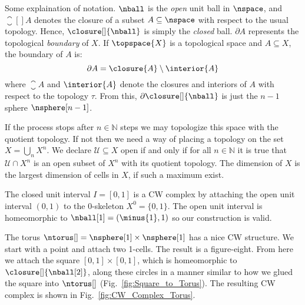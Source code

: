 \documentclass{book}                                                           %
\begin{document}
            \par\hfill\par
            Some explaination of notation. $\nball$ is the \textit{open} unit
            ball in $\nspace$, and $\closure[]{A}$ denotes the closure of a
            subset $A\subseteq\nspace$ with respect to the usual topology.
            Hence, $\closure[]{\nball}$ is simply the \textit{closed} ball.
            $\partial{A}$ represents the topological \textit{boundary} of
            $X$. If $\topspace{X}$ is a topological space and
            $A\subseteq{X}$, the boundary of $A$ is:
            \begin{equation}
                \partial{A}=\closure{A}\setminus\interior{A}
            \end{equation}
            where $\closure{A}$ and $\interior{A}$ denote the closures and
            interiors of $A$ with respect to the topology $\tau$. From this,
            $\partial\closure[]{\nball}$ is just the $n-1$ sphere
            $\nsphere[n-1]$.
            \par\hfill\par
            If the process stops after $n\in\mathbb{N}$ steps we may
            topologize this space with the quotient topology. If not then we
            need a way of placing a topology on the set $X=\bigcup_{n}X^{n}$. We
            declare $\mathcal{U}\subseteq{X}$ open if and only if for all
            $n\in\mathbb{N}$ it is true that $\mathcal{U}\cap{X}^{n}$ is an open
            subset of $X^{n}$ with its quotient topology. The dimension of $X$
            is the largest dimension of cells in $X$, if such a maximum exist.
            \begin{example}
                The closed unit interval $I=[0,1]$ is a CW complex by attaching
                the open unit interval $(0,1)$ to the 0-skeleton
                $X^{0}=\{0,1\}$. The open unit interval is homeomorphic to
                $\nball[1]=(\minus{1},1)$ so our construction is valid.
            \end{example}
            \begin{example}
                The torus $\ntorus[]=\nsphere[1]\times\nsphere[1]$ has a nice
                CW structure. We start with a point and attach two 1-cells. The
                result is a figure-eight. From here we attach the square
                $[0,1]\times[0,1]$, which is homeomorphic to
                $\closure[]{\nball[2]}$, along these circles in a manner similar
                to how we glued the square into $\ntorus[]$
                (Fig.~\ref{fig:Square_to_Torus}). The resulting CW complex is
                shown in Fig.~\ref{fig:CW_Complex_Torus}.
            \end{example}
\end{document}
